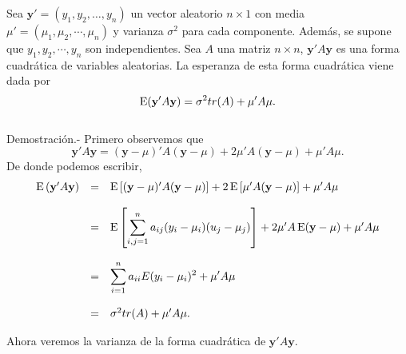 \begin{teo}
    Sea $\textbf{y}'=(y_1,y_2,\ldots,y_n)$ un vector aleatorio $n\times 1$ con media $\mu'=(\mu_1,\mu_2,\cdots,\mu_n)$ y varianza $\sigma^2$ para cada componente. Además, se supone que $y_1,y_2,\cdots,y_n$ son independientes. Sea $A$ una matriz $n\times n$, $\textbf{y}'A\textbf{y}$ es una forma cuadrática de variables aleatorias. La esperanza de esta forma cuadrática viene dada por
    $$\mathop{\mbox{\normalfont E}}\nolimits(\textbf{y}'A\textbf{y})=\sigma^2tr(A)+\mu'A\mu.$$\\
	Demostración.-\; Primero observemos que
	$$\textbf{y}'A\textbf{y}=(\textbf{y}-\mu)'A(\textbf{y}-\mu)+2\mu'A(\textbf{y}-\mu)+\mu'A\mu.$$
	De donde podemos escribir,
	$$
	\begin{array}{rcl}
	    \mathop{\mbox{\normalfont E}}\nolimits\left(\textbf{y}'A\textbf{y}\right) &=& \mathop{\mbox{\normalfont E}}\nolimits\left[(\textbf{y}-\mu)'A(\textbf{y}-\mu)\right] + 2\mathop{\mbox{\normalfont E}}\nolimits\left[\mu'A(\textbf{y}-\mu)\right]+\mu'A\mu\\\\
						  &=& \mathop{\mbox{\normalfont E}}\nolimits\left[\displaystyle\sum_{i,j=1}^n a_{ij}(y_i-\mu_i)(u_j-\mu_j)\right]+2\mu'A\mathop{\mbox{\normalfont E}}\nolimits(\textbf{y}-\mu)+\mu'A\mu\\\\
						  &=& \displaystyle\sum_{i=1}^n a_{ii}E(y_i-\mu_i)^2+\mu'A\mu\\\\
						  &=& \sigma^2tr(A)+\mu'A\mu.
	\end{array}
	$$
\end{teo}

Ahora veremos la varianza de la forma cuadrática de $\textbf{y}'A\textbf{y}$.

